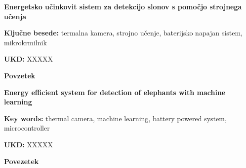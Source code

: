 \begin{poglavje}
\noindent\bfseries Energetsko učinkovit sistem za detekcijo slonov s pomočjo strojnega učenja
\end{poglavje}

\bigskip
\bigskip
\bigskip
\bigskip
\bigskip
\textbf{Ključne besede:} termalna kamera, strojno učenje, baterijsko napajan sistem, mikrokrmilnik

\bigskip
\textbf{UKD:} XXXXX

\bigskip
\bigskip
\bigskip
\bigskip
\textbf{Povzetek}

\lipsum[1-5]
\newpage

\begin{poglavje}
\noindent\bfseries Energy efficient system for detection of elephants with machine learning
\end{poglavje}

\bigskip
\bigskip
\bigskip
\bigskip
\bigskip
\textbf{Key words:} thermal camera, machine learning, battery powered system, microcontroller

\bigskip
\textbf{UKD:} XXXXX

\bigskip
\bigskip
\bigskip
\bigskip
\textbf{Povezetek}

\lipsum[1-5]
\newpage
